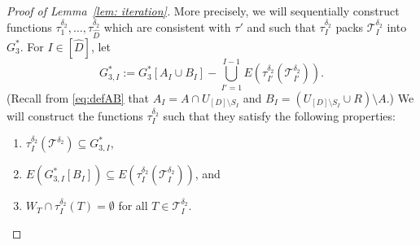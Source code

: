\documentclass[a4paper, 11pt, reqno]{amsart}
\numberwithin{equation}{section}
\newcommand{\1}{{\rm 1\hspace*{-0.4ex}%
\rule{0.1ex}{1.52ex}\hspace*{0.2ex}}}
\newcommand{\I}{I}
\newcommand{\sT}{\mathscr{T}}
\newcommand{\sub}{\subseteq}
\begin{document}
\begin{proof}[Proof of Lemma~\ref{lem: iteration}]
More precisely,
we will sequentially construct functions $\tau^{\delta_2}_{1},\ldots,\tau^{\delta_2}_{\hat{D}}$ 
which are consistent with $\tau'$ and such that $\tau^{\delta_2}_{{\I}}$ packs $\sT^{\delta_2}_{\I}$ into $G_3^*$.
For $I\in [\hat{D}]$, let $$G^*_{3,{\I}}:= G^*_{3}[A_{\I}\cup B_{\I}] - \bigcup_{{\I}'=1}^{{\I}-1} E(\tau^{\delta_2}_{{\I}'}(\sT_{{\I}'}^{\delta_2})).$$ 
(Recall from \eqref{eq:defAB} that $A_{\I}= A\cap U_{[D]\setminus S_{\I}}$ and $B_{\I}= (U_{[D]\setminus S_{\I}}\cup  R)\setminus A$.)
We will construct the functions $\tau_\I^{\delta_2}$ such that they satisfy the following properties:
\begin{enumerate}[label=(Q2.\arabic*)$_{\I}$]
\item\label{item:Q21i} $\tau_\I^{\delta_2}(\sT^{\delta_2})\sub G^*_{3,{\I}}$,
\item\label{item:Q22i} $E(G^*_{3,{\I}}[B_{\I}])\subseteq E(\tau^{\delta_2}_{\I}(\sT_{\I}^{\delta_2}))$, and
\item\label{item:Q23i} $W_T \cap \tau^{\delta_2}_{\I}(T)=\emptyset$ for all $T \in \sT_{\I}^{\delta_2}$. 
\end{enumerate}


\end{proof}
\end{document}
